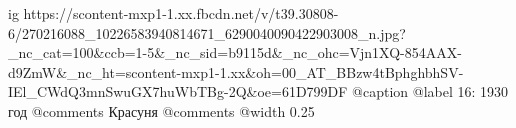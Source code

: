  
 
 
 
 

\ifcmt
  ig https://scontent-mxp1-1.xx.fbcdn.net/v/t39.30808-6/270216088_10226583940814671_6290040090422903008_n.jpg?_nc_cat=100&ccb=1-5&_nc_sid=b9115d&_nc_ohc=Vjn1XQ-854AAX-d9ZmW&_nc_ht=scontent-mxp1-1.xx&oh=00_AT_BBzw4tBphghbhSV-IEl_CWdQ3mnSwuGX7huWbTBg-2Q&oe=61D799DF
	@caption @label 16: 1930 год
	@comments%
    Красуня
	@comments%
  @width 0.25
\fi

